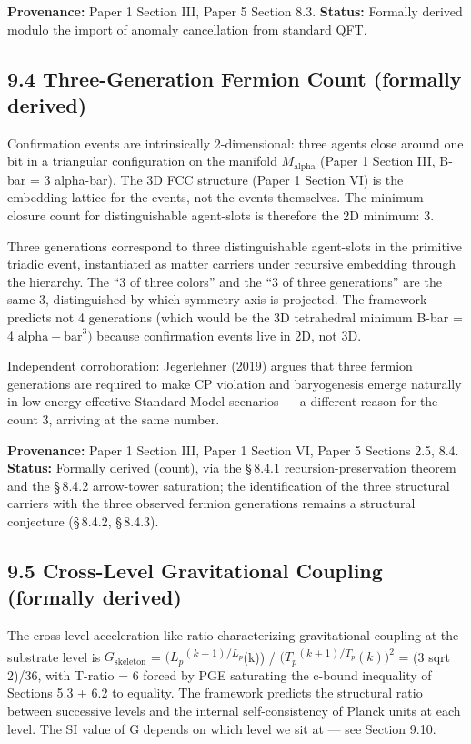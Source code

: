 \documentclass[11pt,oneside]{report}
\theoremstyle{definition}
\theoremstyle{remark}
\begin{document}
\textbf{Provenance:} Paper 1 Section III, Paper 5 Section 8.3.
\textbf{Status:} Formally derived modulo the import of anomaly
cancellation from standard QFT.

\subsection*{9.4 Three-Generation Fermion Count (formally derived)}

Confirmation events are intrinsically 2-dimensional: three agents close
around one bit in a triangular configuration on the manifold \ensuremath{M_{\mathrm{alpha}}}
(Paper 1 Section III, B-bar = 3 alpha-bar). The 3D FCC structure (Paper
1 Section VI) is the embedding lattice for the events, not the events
themselves. The minimum-closure count for distinguishable agent-slots is
therefore the 2D minimum: 3.

Three generations correspond to three distinguishable agent-slots in the
primitive triadic event, instantiated as matter carriers under recursive
embedding through the hierarchy. The ``3 of three colors'' and the ``3
of three generations'' are the same 3, distinguished by which
symmetry-axis is projected. The framework predicts not 4 generations
(which would be the 3D tetrahedral minimum B-bar = 4 \ensuremath{\text{alpha}-\text{bar}^{3})}
because confirmation events live in 2D, not 3D.

Independent corroboration: Jegerlehner (2019) argues that three fermion
generations are required to make CP violation and baryogenesis emerge
naturally in low-energy effective Standard Model scenarios --- a
different reason for the count 3, arriving at the same number.

\textbf{Provenance:} Paper 1 Section III, Paper 1 Section VI, Paper 5
Sections 2.5, 8.4. \textbf{Status:} Formally derived (count), via the
\S\,8.4.1 recursion-preservation theorem and the \S\,8.4.2 arrow-tower
saturation; the identification of the three structural carriers with the
three observed fermion generations remains a structural conjecture
(\S\,8.4.2, \S\,8.4.3).

\subsection*{9.5 Cross-Level Gravitational Coupling (formally derived)}

The cross-level acceleration-like ratio characterizing gravitational
coupling at the substrate level is \ensuremath{G_{\mathrm{skeleton}}} =
\ensuremath{(L_{p}}\textsuperscript{\ensuremath{(k+1)/L_{p}}}(k)) /
\ensuremath{(T_{p}}\textsuperscript{\ensuremath{(k+1)/T_{p}}}\ensuremath{(k))^{2}} = (3 sqrt 2)/36, with T-ratio
= 6 forced by PGE saturating the c-bound inequality of Sections 5.3 +
6.2 to equality. The framework predicts the structural ratio between
successive levels and the internal self-consistency of Planck units at
each level. The SI value of G depends on which level we sit at --- see
Section 9.10.
\end{document}
